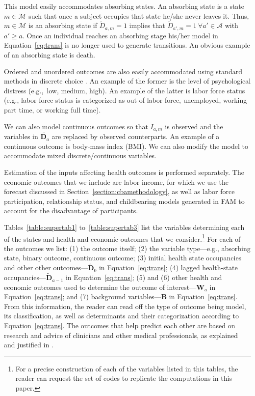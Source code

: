 This model easily accommodates absorbing states. An absorbing state is a state $m \in \mathcal{M}$ such that once a subject occupies that state he/she never leaves it. Thus, $m \in \mathcal{M}$ is an absorbing state if $\tilde{D}_{a,m} = 1$ implies that $\tilde{D}_{a',m} = 1 \ \forall a' \in \mathcal{A}$ with $a' \geq a.$ Once an individual reaches an absorbing stage his/her model in Equation~\eqref{eq:trans} is no longer used to generate transitions. An obvious example of an absorbing state is death.

Ordered and unordered outcomes are also easily accommodated using standard methods in discrete choice \citep[e.g.][]{train2009discrete}. An example of the former is the level of psychological distress (e.g.,\ low, medium, high). An example of the latter is labor force status (e.g., labor force status is categorized as out of labor force, unemployed, working part time, or working full time).

We can also model continuous outcomes so that $I_{a,m}$ is observed and the variables in $\tilde{\bm{D}_a}$
are replaced by observed counterparts. An example of a continuous outcome is body-mass index (BMI). We can also modify the model to accommodate mixed discrete/continuous variables.

Estimation of the inputs affecting health outcomes is performed separately. The economic outcomes that we include are labor income, for which we use the forecast discussed in Section~\ref{section:cbamethodology}, as well as labor force participation, relationship status, and childbearing models generated in FAM to account for the disadvantage of participants.

Tables~\ref{table:supertab1} to~\ref{table:supertab3} list the variables determining each of the states and health and economic outcomes that we consider.\footnote{For a precise construction of each of the variables listed in this tables, the reader can request the set of codes to replicate the computations in this paper.} For each of the outcomes we list: (1) the outcome itself; (2) the variable type---e.g., absorbing state, binary outcome, continuous outcome; (3) initial health state occupancies and other other outcomes---$\tilde{\bm{D}}_0$ in Equation~\eqref{eq:trans}; (4) lagged health-state occupancies---$\tilde{\bm{D}}_{a-1}$ in Equation~\eqref{eq:trans}; (5) and (6) other health and economic outcomes used to determine the outcome of interest---$\bm{W}_a$ in Equation~\eqref{eq:trans}; and (7) background variables---$\bm{B}$ in Equation~\eqref{eq:trans}. From this information, the reader can read off the type of outcome being model, its classification, as well as determinants and their categorization according to Equation~\eqref{eq:trans}. The outcomes that help predict each other are based on research and advice of clinicians and other medical professionals, as explained and justified in \citet{Goldman_etal_2015_Future-Elderly-Model-Report}.

